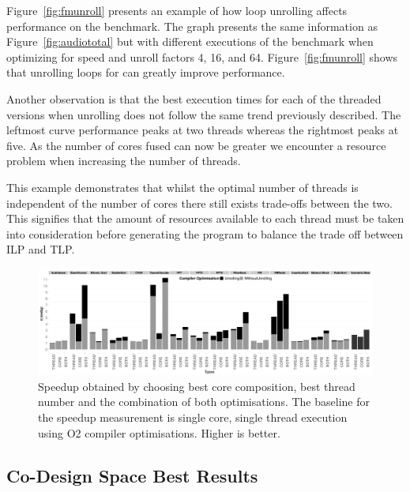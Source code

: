 Figure~\ref{fig:fmunroll} presents an example of how loop unrolling affects performance on the  benchmark.
The graph presents the same information as Figure~\ref{fig:audiototal} but with different executions of the benchmark when optimizing for speed and unroll factors 4, 16, and 64.
Figure~\ref{fig:fmunroll} shows that unrolling loops for  can greatly improve performance.

Another observation is that the best execution times for each of the threaded versions when unrolling does not follow the same trend previously described.
The leftmost curve performance peaks at two threads whereas the rightmost peaks at five.
As the number of cores fused can now be greater we encounter a resource problem when increasing the number of threads.

This example demonstrates that whilst the optimal number of threads is independent of the number of cores there still exists trade-offs between the two.
This signifies that the amount of resources available to each thread must be taken into consideration before generating the program to balance the trade off between ILP and TLP.

\begin{figure}[t]
 \centering
  \centering
    \includegraphics[width=1\textwidth]{streamit-paper/graphics/threadcompbench.pdf}
    \caption{Speedup obtained by choosing best core composition, best
      thread number and the combination of both optimisations. The baseline for the speedup measurement is single core, single thread execution using O2 compiler optimisations. Higher
      is better.}\label{fig:overviewhist}
\end{figure}

\subsection{Co-Design Space Best Results}

